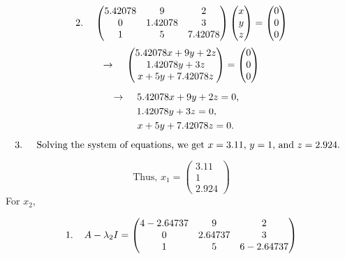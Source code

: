 \documentclass{article}
\begin{document}
\vspace{2mm}

\[
2. \hspace{4mm} \begin{pmatrix} 5.42078 & 9 & 2 \\ 0 & 1.42078 & 3 \\ 1 & 5 & 7.42078 \end{pmatrix} \begin{pmatrix} x \\ y \\ z \end{pmatrix} = \begin{pmatrix} 0 \\ 0 \\ 0 \end{pmatrix}
\]
\[
\rightarrow \hspace{4mm} \begin{pmatrix} 5.42078 x + 9 y + 2 z \\ 1.42078 y + 3 z \\ x + 5 y + 7.42078 z \end{pmatrix} = \begin{pmatrix} 0 \\ 0 \\ 0 \end{pmatrix}
\]

\[
\hspace{-4mm} \rightarrow \hspace{4mm} 5.42078 x + 9 y + 2 z = 0,
\]
\[
\hspace{-2.5mm} \hspace{-1mm} 1.42078 y + 3 z = 0,
\]
\[
\hspace{-2mm} \hspace{5mm} x + 5 y + 7.42078 z = 0.
\]

\[
\text{\hspace{-4mm} 3. \hspace{2mm} Solving the system of equations, we get $x = 3.11$, $y = 1$, and $z = 2.924.$}
\]

\[
\text{Thus, $x_1 = \begin{pmatrix} 3.11 \\ 1 \\ 2.924 \end{pmatrix}$}
\]
For \( x_2 \),

\[
1. \hspace{4mm} A - \lambda_2 I = \begin{pmatrix} 4 - 2.64737 & 9 & 2 \\ 0 & 2.64737 & 3 \\ 1 & 5 & 6 - 2.64737 \end{pmatrix}
\]
\end{document}

